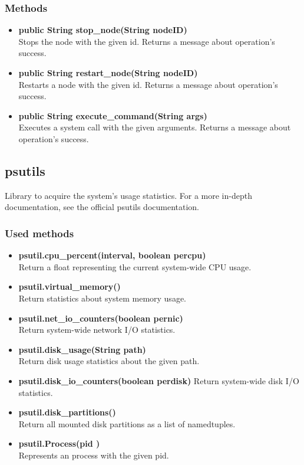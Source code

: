 \subsubsection{Methods}
\begin{itemize}
	\item \textbf{public String stop\_node(String nodeID)}\\
	Stops the node with the given id.
	Returns a message about operation's success.
	\item \textbf{public String restart\_node(String nodeID)}\\
	Restarts a node with the given id.
	Returns a message about operation's success.
	\item \textbf{public String execute\_command(String args)}\\
	Executes a system call with the given arguments.
	Returns a message about operation's success.
\end{itemize}


\subsection{psutils}
Library to acquire the system's usage statistics. For a more in-depth documentation, see the official psutils documentation.

\subsubsection{Used methods}
\begin{itemize}
	\item \textbf{psutil.cpu\_percent(interval, boolean percpu)}\\
	Return a float representing the current system-wide CPU usage.
	\item \textbf{psutil.virtual\_memory()}\\
	Return statistics about system memory usage.
	\item \textbf{psutil.net\_io\_counters(boolean pernic)}\\
	Return system-wide network I/O statistics.
	\item \textbf{psutil.disk\_usage(String path)}\\
	Return disk usage statistics about the given path.
	\item \textbf{psutil.disk\_io\_counters(boolean perdisk)}
	Return system-wide disk I/O statistics.
	\item \textbf{psutil.disk\_partitions()}\\
	Return all mounted disk partitions as a list of namedtuples.
	\item \textbf{psutil.Process(pid )}\\
	Represents an  process with the given pid.
\end{itemize}


	